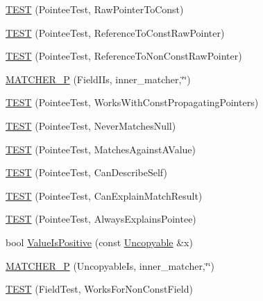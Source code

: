 \begin{DoxyCompactItemize}
\item 
\hyperlink{namespacetesting_1_1gmock__matchers__test_a84a21ee7de697401049cb932f859ee33}{T\+E\+ST} (Pointee\+Test, Raw\+Pointer\+To\+Const)
\item 
\hyperlink{namespacetesting_1_1gmock__matchers__test_aebba40e49fe790490ba88984fdc7c7a6}{T\+E\+ST} (Pointee\+Test, Reference\+To\+Const\+Raw\+Pointer)
\item 
\hyperlink{namespacetesting_1_1gmock__matchers__test_a2d2296f6b23130be225b8df48746dfd5}{T\+E\+ST} (Pointee\+Test, Reference\+To\+Non\+Const\+Raw\+Pointer)
\item 
\hyperlink{namespacetesting_1_1gmock__matchers__test_a43d7cb618a83048cd99b55edbec586bb}{M\+A\+T\+C\+H\+E\+R\+\_\+P} (Field\+I\+Is, inner\+\_\+matcher,\char`\"{}\char`\"{})
\item 
\hyperlink{namespacetesting_1_1gmock__matchers__test_a9d851a5bb597fa45b5d1cf3f295398e8}{T\+E\+ST} (Pointee\+Test, Works\+With\+Const\+Propagating\+Pointers)
\item 
\hyperlink{namespacetesting_1_1gmock__matchers__test_ac778a9cebf9306a5efd27cc1186d8269}{T\+E\+ST} (Pointee\+Test, Never\+Matches\+Null)
\item 
\hyperlink{namespacetesting_1_1gmock__matchers__test_afe22e8230dc7a34498e4b2f91dcdd7cd}{T\+E\+ST} (Pointee\+Test, Matches\+Against\+A\+Value)
\item 
\hyperlink{namespacetesting_1_1gmock__matchers__test_ac8b9baa938635d587f0b0df1073208e2}{T\+E\+ST} (Pointee\+Test, Can\+Describe\+Self)
\item 
\hyperlink{namespacetesting_1_1gmock__matchers__test_a263ede06f6b32a625bb40e4f4c58c8dc}{T\+E\+ST} (Pointee\+Test, Can\+Explain\+Match\+Result)
\item 
\hyperlink{namespacetesting_1_1gmock__matchers__test_a00128de027ff6f49f82a7011dd346d43}{T\+E\+ST} (Pointee\+Test, Always\+Explains\+Pointee)
\item 
bool \hyperlink{namespacetesting_1_1gmock__matchers__test_a7c429b4fa8a7835724d9e28033e908b2}{Value\+Is\+Positive} (const \hyperlink{classtesting_1_1gmock__matchers__test_1_1Uncopyable}{Uncopyable} \&x)
\item 
\hyperlink{namespacetesting_1_1gmock__matchers__test_afcdfddd9d56b20c0692a360115189836}{M\+A\+T\+C\+H\+E\+R\+\_\+P} (Uncopyable\+Is, inner\+\_\+matcher,\char`\"{}\char`\"{})
\item 
\hyperlink{namespacetesting_1_1gmock__matchers__test_a57213a63527bbd66c024dd1cfafe92d1}{T\+E\+ST} (Field\+Test, Works\+For\+Non\+Const\+Field)

\end{DoxyCompactItemize}
